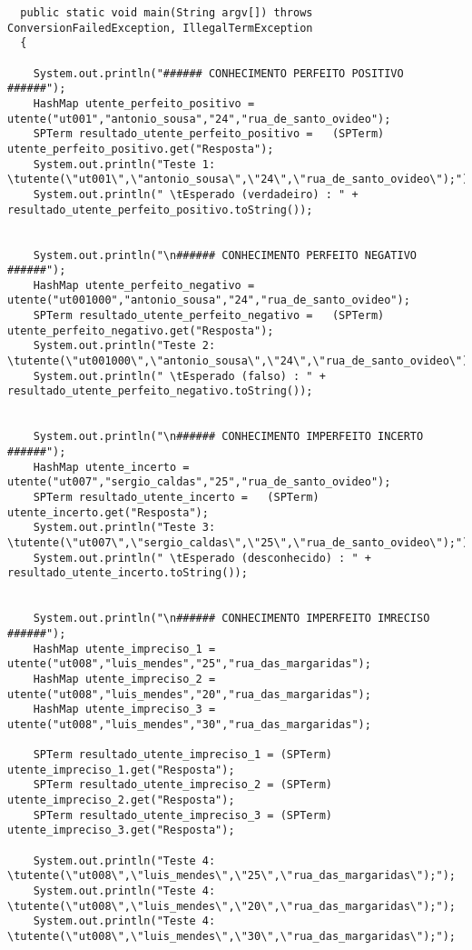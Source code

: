 \documentclass[
  oneside,
  10pt, a4paper,
  footinclude=true,
  headinclude=true,
  cleardoublepage=empty
]{scrbook}
\begin{document}
\begin{lstlisting}
  public static void main(String argv[]) throws ConversionFailedException, IllegalTermException
  {

    System.out.println("###### CONHECIMENTO PERFEITO POSITIVO ######");
    HashMap utente_perfeito_positivo = utente("ut001","antonio_sousa","24","rua_de_santo_ovideo");
    SPTerm resultado_utente_perfeito_positivo =   (SPTerm) utente_perfeito_positivo.get("Resposta");
    System.out.println("Teste 1: \tutente(\"ut001\",\"antonio_sousa\",\"24\",\"rua_de_santo_ovideo\");");
    System.out.println(" \tEsperado (verdadeiro) : " + resultado_utente_perfeito_positivo.toString());


    System.out.println("\n###### CONHECIMENTO PERFEITO NEGATIVO ######");
    HashMap utente_perfeito_negativo = utente("ut001000","antonio_sousa","24","rua_de_santo_ovideo");
    SPTerm resultado_utente_perfeito_negativo =   (SPTerm) utente_perfeito_negativo.get("Resposta");
    System.out.println("Teste 2: \tutente(\"ut001000\",\"antonio_sousa\",\"24\",\"rua_de_santo_ovideo\");");
    System.out.println(" \tEsperado (falso) : " + resultado_utente_perfeito_negativo.toString());


    System.out.println("\n###### CONHECIMENTO IMPERFEITO INCERTO ######");
    HashMap utente_incerto = utente("ut007","sergio_caldas","25","rua_de_santo_ovideo");
    SPTerm resultado_utente_incerto =   (SPTerm) utente_incerto.get("Resposta");
    System.out.println("Teste 3: \tutente(\"ut007\",\"sergio_caldas\",\"25\",\"rua_de_santo_ovideo\");");
    System.out.println(" \tEsperado (desconhecido) : " + resultado_utente_incerto.toString());


    System.out.println("\n###### CONHECIMENTO IMPERFEITO IMRECISO ######");
    HashMap utente_impreciso_1 = utente("ut008","luis_mendes","25","rua_das_margaridas");
    HashMap utente_impreciso_2 = utente("ut008","luis_mendes","20","rua_das_margaridas");
    HashMap utente_impreciso_3 = utente("ut008","luis_mendes","30","rua_das_margaridas");

    SPTerm resultado_utente_impreciso_1 = (SPTerm) utente_impreciso_1.get("Resposta");
    SPTerm resultado_utente_impreciso_2 = (SPTerm) utente_impreciso_2.get("Resposta");
    SPTerm resultado_utente_impreciso_3 = (SPTerm) utente_impreciso_3.get("Resposta");

    System.out.println("Teste 4: \tutente(\"ut008\",\"luis_mendes\",\"25\",\"rua_das_margaridas\");");
    System.out.println("Teste 4: \tutente(\"ut008\",\"luis_mendes\",\"20\",\"rua_das_margaridas\");");
    System.out.println("Teste 4: \tutente(\"ut008\",\"luis_mendes\",\"30\",\"rua_das_margaridas\");");


\end{lstlisting}
\end{document}
